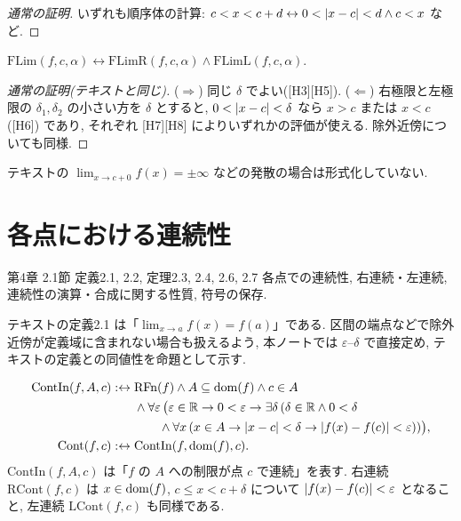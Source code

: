\begin{lem}\end{lem}
\begin{proof}[通常の証明]
  いずれも順序体の計算: $c < x < c + d \leftrightarrow 0 < \lvert x - c\rvert < d \land c < x$ など.
\end{proof}

\begin{thm}[テキスト定理1.19]
  $\mathrm{FLim}(f, c, \alpha) \leftrightarrow \mathrm{FLimR}(f, c, \alpha) \land \mathrm{FLimL}(f, c, \alpha)$.
\end{thm}
\begin{proof}[通常の証明(テキストと同じ)]
  ($\Rightarrow$) 同じ $\delta$ でよい([H3][H5]). ($\Leftarrow$) 右極限と左極限の $\delta_1, \delta_2$ の小さい方を $\delta$ とすると, $0 < \lvert x - c\rvert < \delta$ なら $x > c$ または $x < c$ ([H6]) であり, それぞれ [H7][H8] によりいずれかの評価が使える. 除外近傍についても同様.
\end{proof}

テキストの $\lim_{x \to c+0} f(x) = \pm\infty$ などの発散の場合は形式化していない.

\section{各点における連続性}

\begin{textref}{第4章 2.1節 定義2.1, 2.2, 定理2.3, 2.4, 2.6, 2.7}
  各点での連続性, 右連続・左連続, 連続性の演算・合成に関する性質, 符号の保存.
\end{textref}

テキストの定義2.1 は「$\lim_{x \to a} f(x) = f(a)$」である. 区間の端点などで除外近傍が定義域に含まれない場合も扱えるよう, 本ノートでは $\varepsilon$--$\delta$ で直接定め, テキストの定義との同値性を命題として示す.

\begin{dfn}[テキスト定義2.1, 2.2]
  \begin{align*}
    \mathrm{ContIn}(f, A, c) :\leftrightarrow{}& \mathrm{RFn}(f) \land A \subseteq \mathrm{dom}(f) \land c \in A \\
    & \land \forall\varepsilon\,\bigl(\varepsilon \in \mathbb{R} \to 0 < \varepsilon \to \exists\delta\,(\delta \in \mathbb{R} \land 0 < \delta \\
    & \qquad \land \forall x\,(x \in A \to \lvert x - c\rvert < \delta \to \lvert f(x) - f(c)\rvert < \varepsilon))\bigr),\\
    \mathrm{Cont}(f, c) :\leftrightarrow{}& \mathrm{ContIn}(f, \mathrm{dom}(f), c).
  \end{align*}
  $\mathrm{ContIn}(f, A, c)$ は「$f$ の $A$ への制限が点 $c$ で連続」を表す. 右連続 $\mathrm{RCont}(f, c)$ は $x \in \mathrm{dom}(f)$, $c \leq x < c + \delta$ について $\lvert f(x) - f(c)\rvert < \varepsilon$ となること, 左連続 $\mathrm{LCont}(f, c)$ も同様である.
\end{dfn}

